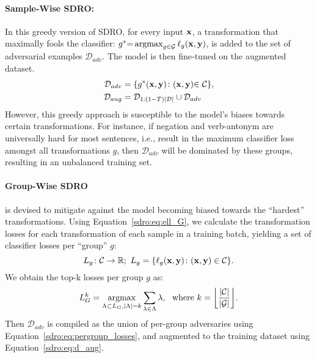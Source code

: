 \paragraph{Sample-Wise SDRO:}
    In this greedy version of SDRO, for every input $\operatorname{\mathbf{x}}$, a transformation that maximally fools the classifier: $g^*{=}\operatorname*{argmax}_{g\in\mathcal{G}} \ell_g(\operatorname{\mathbf{x}}, \operatorname{\mathbf{y}})$, is added to the set of adversarial examples $\mathcal{D}_{adv}$. The model is then fine-tuned on the augmented dataset.
    \begin{align}
        \mathcal{D}_{adv} &= \{ g^*(\operatorname{\mathbf{x}}, \operatorname{\mathbf{y}}) \colon (\operatorname{\mathbf{x}}, \operatorname{\mathbf{y}}){\in}~\mathcal{C}\}, \\
        \mathcal{D}_{aug} &= \mathcal{D}_{1:(1-T)|\mathcal{D}|} \cup \mathcal{D}_{adv}
        \label{sdro:eq:d_aug}
    \end{align}
    However, this greedy approach is susceptible to the model's biases towards certain transformations.  
    For instance, if negation and verb-antonym are universally hard for most sentences, i.e., result in the maximum classifier loss amongst all  transformations $g$, then $\mathcal{D}_{adv}$ will be dominated by these groups, resulting in an unbalanced training set.
    
\paragraph{Group-Wise SDRO}
is devised to mitigate against the model becoming biased towards the ``hardest'' transformations.
    Using Equation~\ref{sdro:eq:ell_G}, we calculate the transformation losses for each transformation of each sample in a training batch, yielding a set of classifier losses per ``group'' $g$:
    \begin{equation}
        L_g \colon \mathcal{C} \rightarrow \operatorname{\mathbb{R}};
        ~L_g = \{ \ell_g(\operatorname{\mathbf{x}}, \operatorname{\mathbf{y}}) \colon (\operatorname{\mathbf{x}}, \operatorname{\mathbf{y}}) \in \mathcal{C}\}.
    \end{equation}
    We obtain the top-k losses per group $g$ as:
    \begin{equation}
        L_G^k = \argmax_{\Lambda \subset L_G, |\Lambda| = k} \sum_{\lambda\in\Lambda} \lambda,
        ~~\text{where~}k = \floor*{\frac{|\mathcal{C}|}{|\mathcal{G}|}}.
        \label{sdro:eq:pergroup_losses}
    \end{equation}
    Then 
    $\mathcal{D}_{adv}$ is compiled as the union of per-group adversaries using Equation~\ref{sdro:eq:pergroup_losses}, and augmented to the training dataset using Equation~\ref{sdro:eq:d_aug}.
    
